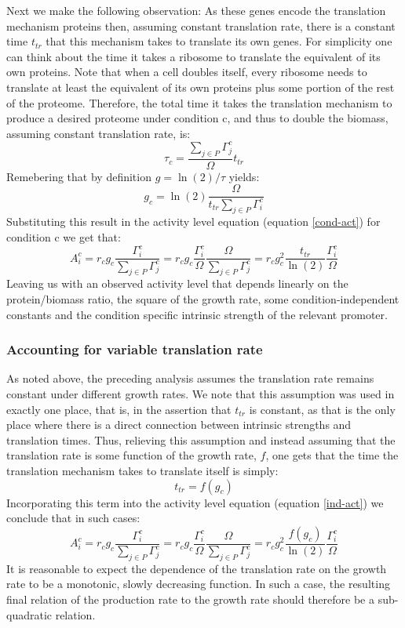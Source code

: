 \documentclass{report}
\begin{document}
Next we make the following observation:
As these genes encode the translation mechanism proteins then, assuming constant translation rate, there is a constant time $t_{tr}$ that this mechanism takes to translate its own genes.
For simplicity one can think about the time it takes a ribosome to translate the equivalent of its own proteins.
Note that when a cell doubles itself, every ribosome needs to translate at least the equivalent of its own proteins plus some portion of the rest of the proteome.
Therefore, the total time it takes the translation mechanism to produce a desired proteome under condition c, and thus to double the biomass, assuming constant translation rate, is:
\[\tau_c=\frac{\sum_{j\in P}\Gamma^c_j}{\Omega}t_{tr}\]
Remebering that by  definition $g=\ln(2)/\tau$ yields:
\[g_c=\ln(2)\frac{\Omega}{t_{tr}\sum_{j\in P}\Gamma^c_i}\]
Substituting this result in the activity level equation (equation \ref{cond-act}) for condition c we get that:
\begin{equation}
\label{ind-act}
A^c_i=r_c g_c \frac{\Gamma^c_i}{\sum_{j\in P}\Gamma^c_j}=r_c g_c \frac{\Gamma^c_i}{\Omega}\frac{\Omega}{\sum_{j\in P}\Gamma^c_j}=r_c g_c^2\frac{t_{tr}}{\ln(2)}\frac{\Gamma^c_i}{\Omega}
\end{equation}
Leaving us with an observed activity level that depends linearly on the protein/biomass ratio, the square of the growth rate, some condition-independent constants and the condition specific intrinsic strength of the relevant promoter.
\subsubsection{Accounting for variable translation rate}
As noted above, the preceding analysis assumes the translation rate remains constant under different growth rates.
We note that this assumption was used in exactly one place, that is, in the assertion that $t_{tr}$ is constant, as that is the only place where there is a direct connection between intrinsic strengths and translation times.
Thus, relieving this assumption and instead assuming that the translation rate is some function of the growth rate, $f$, one gets that the time the translation mechanism takes to translate itself is simply:
\begin{equation}
t_{tr}=f(g_c)
\end{equation}
Incorporating this term into the activity level equation (equation \ref{ind-act}) we conclude that in such cases:
\begin{equation}
A^c_i=r_c g_c \frac{\Gamma^c_i}{\sum_{j\in P}\Gamma^c_j}=r_c g_c \frac{\Gamma^c_i}{\Omega}\frac{\Omega}{\sum_{j\in P}\Gamma^c_j}=r_c g_c^2\frac{f(g_c)}{\ln(2)}\frac{\Gamma^c_i}{\Omega}
\end{equation}
It is reasonable to expect the dependence of the translation rate on the growth rate to be a monotonic, slowly decreasing function.
In such a case, the resulting final relation of the production rate to the growth rate should therefore be a sub-quadratic relation.
\end{document}

